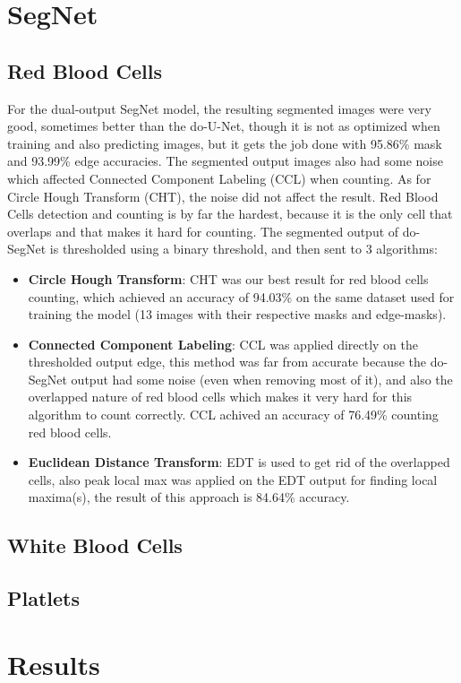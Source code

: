 

\section{SegNet}



\subsection{Red Blood Cells}
For the dual-output SegNet model, the resulting segmented images were very good, sometimes better than the do-U-Net, though it is not as optimized when training and also predicting images, but it gets the job done with 95.86\% mask and 93.99\% edge accuracies. The segmented output images also had some noise which affected Connected Component Labeling (CCL) when counting.
As for Circle Hough Transform (CHT), the noise did not affect the result.
Red Blood Cells detection and counting is by far the hardest, because it is the only cell that overlaps and that makes it hard for counting.
The segmented output of do-SegNet is thresholded using a binary threshold, and then sent to 3 algorithms:

\begin{itemize}
  \item \textbf{Circle Hough Transform}: CHT was our best result for red blood cells counting, which achieved an accuracy of 94.03\% on the same dataset used for training the model (13 images with their respective masks and edge-masks).
  \item \textbf{Connected Component Labeling}: CCL was applied directly on the thresholded output edge, this method was far from accurate because the do-SegNet output had some noise (even when removing most of it), and also the overlapped nature of red blood cells which makes it very hard for this algorithm to count correctly. CCL achived an accuracy of 76.49\% counting red blood cells.
  \item \textbf{Euclidean Distance Transform}: EDT is used to get rid of the overlapped cells, also peak local max was applied on the EDT output for finding local maxima(s), the result of this approach is 84.64\% accuracy.
\end{itemize}



\subsection{White Blood Cells}



\subsection{Platlets}




\section{Results}
\vspace{0.2in}
\hspace*{0.16in}

